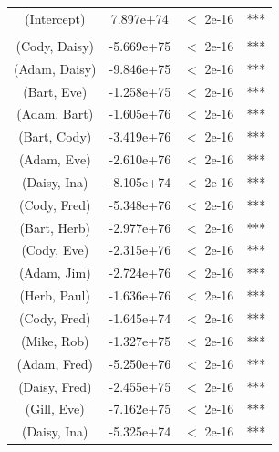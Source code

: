 \begin{table}[t!]
\begin{tabular}{cccc}
%
(Intercept)            &  7.897e+74 &  $<$ 2e-16 & ***\\
\\
(Cody, Daisy)  &  	-5.669e+75  &  $<$ 2e-16 & ***\\
(Adam, Daisy)  &   -9.846e+75  &   $<$ 2e-16 &***\\
(Bart, Eve)  	&   -1.258e+75  &$<$ 2e-16 &***\\
(Adam, Bart)  	&   -1.605e+76  & $<$ 2e-16 &***\\
(Bart, Cody)  	&   -3.419e+76  & $<$ 2e-16 &***\\
(Adam, Eve)  	&   -2.610e+76  & $<$ 2e-16 &***\\
(Daisy, Ina)  	&  	-8.105e+74 	 &  $<$ 2e-16 &***\\
(Cody, Fred)  	&   -5.348e+76  &$<$ 2e-16 &***\\
(Bart, Herb)  	&   -2.977e+76  &$<$ 2e-16 &***\\
(Cody, Eve)  	&   -2.315e+76  & $<$ 2e-16 &***\\
(Adam, Jim)  	&   -2.724e+76    & $<$ 2e-16 &***\\
(Herb, Paul)  	&   -1.636e+76      &$<$ 2e-16 &***\\
(Cody, Fred)  	&   -1.645e+74     & $<$ 2e-16 &***\\
(Mike, Rob)  	&   -1.327e+75    & $<$ 2e-16 &***\\
(Adam, Fred)  	&   -5.250e+76     & $<$ 2e-16 &***\\
(Daisy, Fred)  &   -2.455e+75      &$<$ 2e-16 &***\\
(Gill, Eve)	  	&   -7.162e+75    & $<$ 2e-16 &***\\
(Daisy, Ina)  	&   -5.325e+74      &$<$ 2e-16 &***\\

\end{tabular}
\end{table}
